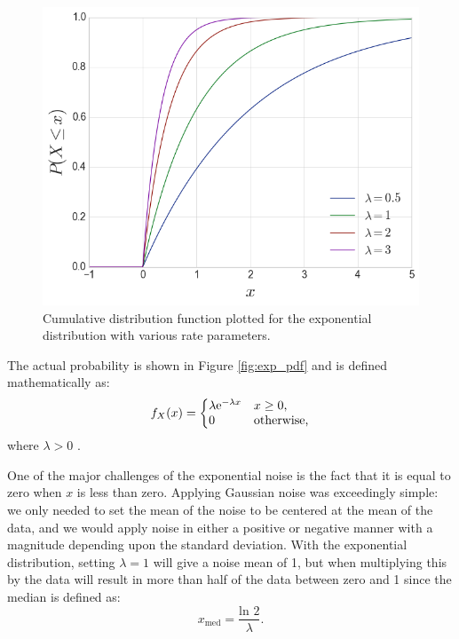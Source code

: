 \documentclass[conference]{IEEEtran}
\begin{document}
\begin{figure}
	\centering
	\includegraphics[width=1\linewidth]{images/exp_cdf}
	\caption{Cumulative distribution function plotted for the exponential distribution with various rate parameters.}
	\label{fig:exp_cdf}
\end{figure}

The actual probability is shown in Figure \ref{fig:exp_pdf} and is defined mathematically as:
\begin{equation}\label{eq:exp_pdf}
	f_{X}(x) = \left\{
		\begin{array}{@{}ll@{}}
			\lambda {\rm e}^{-\lambda x} & x \geq 0 \text{,} \\
			0 & \text{otherwise,}
		\end{array}\right.
\end{equation}
where $\lambda > 0$ \cite{yates_probability_2014}.

One of the major challenges of the exponential noise is the fact that it is equal to zero when $x$ is less than zero. 
Applying Gaussian noise was exceedingly simple: we only needed to set the mean of the noise to be centered at the mean of the data, and we would apply noise in either a positive or negative manner with a magnitude depending upon the standard deviation.
With the exponential distribution, setting $\lambda = 1$ will give a noise mean of 1, but when multiplying this by the data will result in more than half of the data between zero and 1 since the median is defined as:
\begin{equation}\label{eq:exp_scale}
	x_\text{med} = \frac{\text{ln } 2}{\lambda}.
\end{equation}
\end{document}
